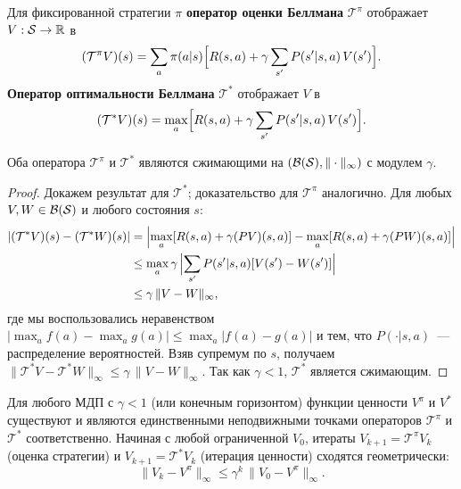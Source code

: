 \begin{definition}
\label{def:bellman-op}
Для фиксированной стратегии $\pi$ \textbf{оператор оценки Беллмана} $\mathcal{T}^\pi$ отображает $V : \mathcal{S} \to \mathbb{R}$ в
\[
    (\mathcal{T}^\pi V)(s)
    = \sum_a \pi(a|s)\Bigl[R(s,a) + \gamma \sum_{s'} P(s'|s,a)\,V(s')\Bigr].
\]
\textbf{Оператор оптимальности Беллмана} $\mathcal{T}^*$ отображает $V$ в
\[
    (\mathcal{T}^* V)(s)
    = \max_a \Bigl[R(s,a) + \gamma \sum_{s'} P(s'|s,a)\,V(s')\Bigr].
\]
\end{definition}

\begin{theorem}
\label{thm:bellman-contraction}
Оба оператора $\mathcal{T}^\pi$ и $\mathcal{T}^*$ являются сжимающими на $(\mathcal{B}(\mathcal{S}), \|\cdot\|_\infty)$ с модулем $\gamma$.
\end{theorem}

\begin{proof}
Докажем результат для $\mathcal{T}^*$; доказательство для $\mathcal{T}^\pi$ аналогично. Для любых $V, W \in \mathcal{B}(\mathcal{S})$ и любого состояния $s$:
\begin{align*}
|(\mathcal{T}^* V)(s) - (\mathcal{T}^* W)(s)|
&= \Bigl|\max_a [R(s,a) + \gamma(PV)(s,a)]
   - \max_a [R(s,a) + \gamma(PW)(s,a)]\Bigr| \\
&\leq \max_a \gamma\,\Bigl|\sum_{s'} P(s'|s,a)[V(s')-W(s')]\Bigr| \\
&\leq \gamma\,\|V - W\|_\infty,
\end{align*}
где мы воспользовались неравенством $|\max_a f(a) - \max_a g(a)| \leq \max_a |f(a)-g(a)|$ и тем, что $P(\cdot|s,a)$~--- распределение вероятностей. Взяв супремум по $s$, получаем $\|\mathcal{T}^* V - \mathcal{T}^* W\|_\infty \leq \gamma\,\|V-W\|_\infty$. Так как $\gamma < 1$, $\mathcal{T}^*$ является сжимающим.
\end{proof}

\begin{corollary}
\label{cor:value-exists}
Для любого МДП с $\gamma < 1$ (или конечным горизонтом) функции ценности $V^\pi$ и $V^*$ существуют и являются единственными неподвижными точками операторов $\mathcal{T}^\pi$ и $\mathcal{T}^*$ соответственно. Начиная с любой ограниченной $V_0$, итераты $V_{k+1} = \mathcal{T}^\pi V_k$ (оценка стратегии) и $V_{k+1} = \mathcal{T}^* V_k$ (итерация ценности) сходятся геометрически:
\[
    \|V_k - V^\pi\|_\infty \leq \gamma^k\,\|V_0 - V^\pi\|_\infty.
\]
\end{corollary}

